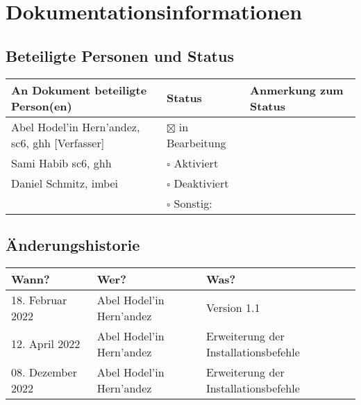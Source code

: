 \chapter{Dokumentationsinformationen}

\section{Beteiligte Personen und Status}
\begin{table}[ht]
	\centering  	
	\begin{tabular}{||l|l|l||}   		
		\hline
		An Dokument beteiligte Person(en) & Status & Anmerkung zum Status \\
		\hline\hline
		Abel Hodel'in Hern'andez, \acs{sc6}, \acs{ghh} [Verfasser] &  $\boxtimes$ in Bearbeitung & \\
		
		Sami Habib \acs{sc6}, \acs{ghh} & $\square$ Aktiviert & \\
		
		Daniel Schmitz, \acs{imbei} & $\square$ Deaktiviert &  \\
		
		& $\square$ Sonstig: &   \\
		\hline
	\end{tabular}
\end{table}

\section{Änderungshistorie}

\begin{table}[ht]
	\centering  	
	\begin{tabular}{||l|l|l||}   		
		\hline
		Wann? & Wer? & Was? \\
		\hline\hline
		18. Februar 2022 &  Abel Hodel'in Hern'andez & Version 1.1 \\
		\hline
		12. April 2022 &  Abel Hodel'in Hern'andez & Erweiterung der Installationsbefehle \\
		\hline
		08. Dezember 2022 &  Abel Hodel'in Hern'andez & Erweiterung der Installationsbefehle \\
		\hline
	\end{tabular}
\end{table}